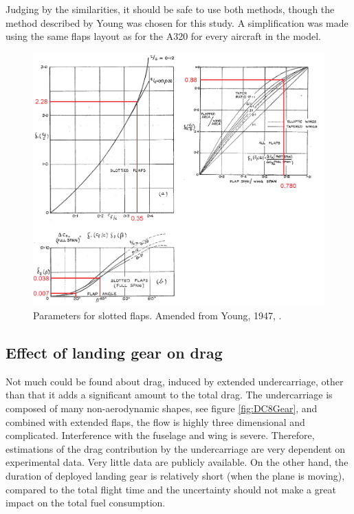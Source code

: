 \documentclass[english]{kththesis}
\begin{document}
Judging by the similarities, it should be safe to use both methods, though the method described by Young was chosen for this study. A simplification was made using the same flaps layout as for the A320 for every aircraft in the model.

\begin{figure}[hb]
    \centering
    \includegraphics[width=1\textwidth]{Epictures/SlottedFlapsParametersA320-Young.png}
    \caption{Parameters for slotted flaps. Amended from Young, 1947, \cite{Young1947}.}
    \label{fig:A320Param}
\end{figure}


\subsection{Effect of landing gear on drag}
\label{sec:landinggearondrag}
Not much could be found about drag, induced by extended undercarriage, other than that it adds a significant amount to the total drag. The undercarriage is composed of many non-aerodynamic shapes, see figure \ref{fig:DC8Gear}, and combined with extended flaps, the flow is highly three dimensional and complicated. Interference with the fuselage and wing is severe. Therefore, estimations of the drag contribution by the undercarriage are very dependent on experimental data. Very little data are publicly available. On the other hand, the duration of deployed landing gear is relatively short (when the plane is moving), compared to the total flight time and the uncertainty should not make a great impact on the total fuel consumption.
\end{document}
